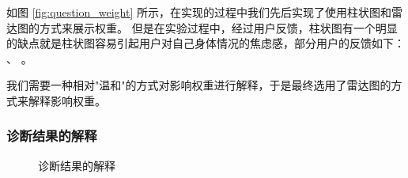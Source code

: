 如图 \ref{fig:question_weight} 所示，在实现的过程中我们先后实现了使用柱状图和雷达图的方式来展示权重。
但是在实验过程中，经过用户反馈，柱状图有一个明显的缺点就是柱状图容易引起用户对自己身体情况的焦虑感，部分用户的反馈如下：
、
。

我们需要一种相对"温和"的方式对影响权重进行解释，于是最终选用了雷达图的方式来解释影响权重。



\subsubsection{诊断结果的解释}
\begin{figure}[ht]
    \centering
    \caption{诊断结果的解释}
    \label{fig:exp_result}
\end{figure}


